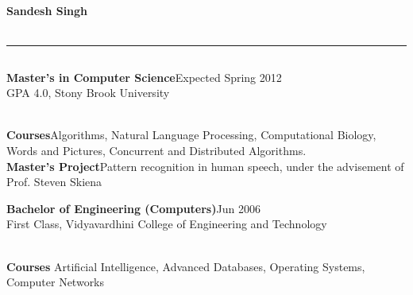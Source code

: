 \documentclass[a4paper,11pt,final]{article}
\newcommand{\resumetitle}[1]{%
  \subsection*{%
    \Large\sc{\textbf{#1}}%
  }%
  
}%
\newcommand{\eduexp}[3]{%
\noindent\textbf{#1}\hfill{#2}\normalsize\\{#3}\vspace{3pt}%
}
\newcommand{\resumedescheader}[1]{%
  \bigskip
  \resumetitle{#1}
}%
\begin{document}
\pagestyle{empty}

\begin{center}
  \centering\Large\textbf{Sandesh Singh}\normalsize \\
   \\
  \rule[2pt]{0.99\linewidth}{.1pt}
\end{center}

\vspace{-20pt}
\resumedescheader{Education}
\eduexp
	{Master's in Computer Science}
	{Expected Spring 2012}
	{GPA 4.0, Stony Brook University}
\\ \noindent \textbf{Courses}\quad Algorithms, Natural Language Processing, Computational Biology, Words and Pictures, Concurrent and Distributed Algorithms.
\\ \noindent \textbf{Master's Project}\quad Pattern recognition in human speech, under the advisement of Prof. Steven Skiena
\\
\vspace{-5pt}

\eduexp
	{Bachelor of Engineering (Computers)}
	{Jun 2006}
	{First Class, Vidyavardhini College of Engineering and Technology}
\\ \noindent \textbf{Courses} Artificial Intelligence, Advanced Databases, Operating Systems, Computer Networks
\end{document}
